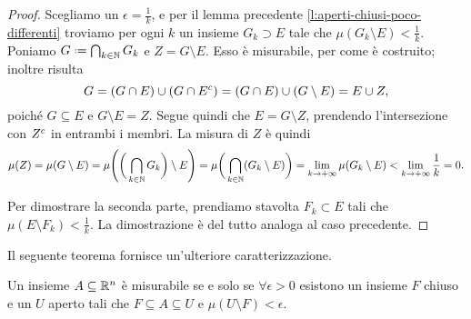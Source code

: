 \begin{proof}
	Scegliamo un $\epsilon=\frac1{k}$, e per il lemma precedente \ref{l:aperti-chiusi-poco-differenti} troviamo per ogni $k$ un insieme $G_k\supset E$ tale che $\mu(G_k\setminus E)<\frac1{k}$.
	Poniamo $G\defeq\bigcap_{k\in\N}G_k$ e $Z=G\setminus E$.
	Esso è misurabile, per come è costruito; inoltre risulta
	\begin{equation}
		G=(G\cap E)\cup(G\cap{E}^c)=(G\cap E)\cup(G\setminus E)=E\cup Z,
	\end{equation}
	poich\'e $G\subseteq E$ e $G\setminus E=Z$.
	Segue quindi che $E=G\setminus Z$, prendendo l'intersezione con ${Z}^c$ in entrambi i membri.
	La misura di $Z$ è quindi
	\begin{equation}
		\mu(Z)=\mu(G\setminus E)=\mu\Bigg(\bigg(\bigcap_{k\in\mathbb{N}}G_k\bigg)\setminus E\Bigg)=\mu\bigg(\bigcap_{k\in\mathbb{N}}(G_k\setminus E)\bigg)=\lim_{k\to+\infty}\mu(G_k\setminus E)<\lim_{k\to+\infty}\frac1{k}=0.
	\end{equation}

	Per dimostrare la seconda parte, prendiamo stavolta $F_k\subset E$ tali che $\mu(E\setminus F_k)<\frac1{k}$.
	La dimostrazione è del tutto analoga al caso precedente.
\end{proof}
Il seguente teorema fornisce un'ulteriore caratterizzazione.
\begin{teorema}
	Un insieme $A\subseteq\mathbb{R}^n$ è misurabile se e solo se $\forall\epsilon>0$ esistono un insieme $F$ chiuso e un $U$ aperto tali che $F\subseteq A\subseteq U$ e $\mu(U\setminus F)<\epsilon$.
\end{teorema}
